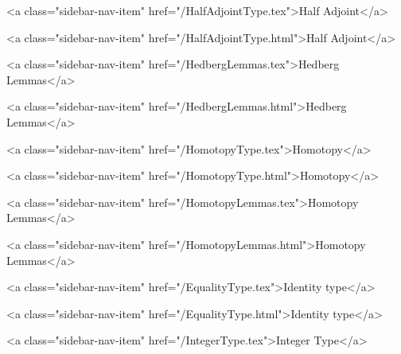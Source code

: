           <a class="sidebar-nav-item" href="/HalfAdjointType.tex">Half Adjoint</a>
        
      
    
      
        
          <a class="sidebar-nav-item" href="/HalfAdjointType.html">Half Adjoint</a>
        
      
    
      
        
          <a class="sidebar-nav-item" href="/HedbergLemmas.tex">Hedberg Lemmas</a>
        
      
    
      
        
          <a class="sidebar-nav-item" href="/HedbergLemmas.html">Hedberg Lemmas</a>
        
      
    
      
        
          <a class="sidebar-nav-item" href="/HomotopyType.tex">Homotopy</a>
        
      
    
      
        
          <a class="sidebar-nav-item" href="/HomotopyType.html">Homotopy</a>
        
      
    
      
        
          <a class="sidebar-nav-item" href="/HomotopyLemmas.tex">Homotopy Lemmas</a>
        
      
    
      
        
          <a class="sidebar-nav-item" href="/HomotopyLemmas.html">Homotopy Lemmas</a>
        
      
    
      
        
          <a class="sidebar-nav-item" href="/EqualityType.tex">Identity type</a>
        
      
    
      
        
          <a class="sidebar-nav-item" href="/EqualityType.html">Identity type</a>
        
      
    
      
        
          <a class="sidebar-nav-item" href="/IntegerType.tex">Integer Type</a>
        
      
    
      
        
